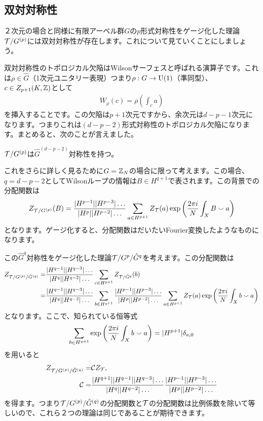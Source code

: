 \documentclass[generalized_symmetry.tex]{subfiles}
\begin{document}
\subsection{双対対称性}
２次元の場合と同様に有限アーベル群$G$の$p$形式対称性をゲージ化した理論$\mathcal{T}/G^{(p)}$には双対対称性が存在します。これについて見ていくことにしましょう。

双対対称性のトポロジカル欠陥はWilsonサーフェスと呼ばれる演算子です。これは$\rho\in \hat{G}$（1次元ユニタリー表現）つまり$\rho:G\to \mbox{U}(1)$（準同型）、$c \in Z_{p+1}(K,\mathbb{Z})$として
\begin{align}
  W_{\rho}(c) = \rho\left(\int_{c} a\right)
\end{align}
を挿入することです。この欠陥は$p+1$次元ですから、余次元は$d-p-1$次元になります。つまりこれは$(d-p-2)$形式対称性のトポロジカル欠陥になります。まとめると、次のことが言えました。
\begin{emphasize}
  $\mathcal{T}/G^{(p)}$は$\hat{G}^{(d-p-2)}$対称性を持つ。
\end{emphasize}

これをさらに詳しく見るために$G=\mathbb{Z}_N$の場合に限って考えます。この場合、$q=d-p-2$としてWilsonループの情報は$B \in H^{q+1}$で表されます。この背景での分配関数は
\begin{align}
  Z_{\mathcal{T}/G^{(p)}}(B) = \frac{|H^{p-1}||H^{p-3}|\dots }{|H^p||H^{p-2}|\dots } \sum_{a \in H^{p+1}} Z_{\mathcal{T}}(a) \exp\left(\frac{2\pi i}{N}\int_{X} B\smallsmile a\right)
\end{align}
となります。ゲージ化すると、分配関数はだいたいFourier変換したようなものになります。

この$\hat{G}^{q}$対称性をゲージ化した理論$\mathcal{T}/G^{p}/\hat{G}^q$を考えます。この分配関数は
\begin{align}
  Z_{\mathcal{T}/G^{(p)}/\hat{G}^{(q)}} =& \frac{|H^{q-1}||H^{q-3}|\dots }{|H^q||H^{q-2}|\dots } \sum_{c \in H^{p+1}} Z_{\mathcal{T}/\hat{G}^{q}}(b)\notag\\
  =&\frac{|H^{q-1}||H^{q-3}|\dots }{|H^q||H^{q-2}|\dots } \sum_{b \in H^{q+1}} \frac{|H^{p-1}||H^{p-3}|\dots }{|H^p||H^{p-2}|\dots } \sum_{a \in H^{p+1}} Z_{\mathcal{T}}(a) \exp\left(\frac{2\pi i}{N}\int_{X} b\smallsmile a\right)
\end{align}
となります。ここで、知られている恒等式
\begin{align}
  \sum_{b \in H^{q+1}}\exp\left(\frac{2\pi i}{N}\int_{X} b\smallsmile a\right)=
  |H^{p+1}|\delta_{a,0}
  \label{completenessidentity}
\end{align}
を用いると
\begin{align}
  Z_{\mathcal{T}/G^{(p)}/\hat{G}^{(q)}} =& \mathcal{C} Z_{\mathcal{T}},\\
  \mathcal{C}=&
  \frac{|H^{q+1}||H^{q-1}||H^{q-3}|\dots }{|H^q||H^{q-2}|\dots }\frac{|H^{p-1}||H^{p-3}|\dots }{|H^p||H^{p-2}|\dots } 
\end{align}
を得ます。つまり$\mathcal{T}/G^{(p)}/\hat{G}^{(q)}$の分配関数と$\mathcal{T}$の分配関数は比例係数を除いて等しいので、これら２つの理論は同じであることが期待できます。
\end{document}
